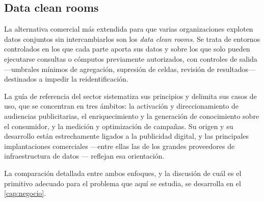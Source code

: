 \subsection{Data clean rooms}

La alternativa comercial más extendida para que varias organizaciones exploten datos conjuntos sin
intercambiarlos son los \emph{data clean rooms}. Se trata de entornos controlados en los que cada
parte aporta sus datos y sobre los que solo pueden ejecutarse consultas o cómputos previamente
autorizados, con controles de salida —umbrales mínimos de agregación, supresión de celdas, revisión
de resultados— destinados a impedir la reidentificación.

La guía de referencia del sector \parencite{iabtechlab2024} sistematiza sus principios y delimita
sus casos de uso, que se concentran en tres ámbitos: la activación y direccionamiento de audiencias
publicitarias, el enriquecimiento y la generación de conocimiento sobre el consumidor, y la
medición y optimización de campañas. Su origen y su desarrollo están estrechamente ligados a la
publicidad digital, y las principales implantaciones comerciales —entre ellas las de los grandes
proveedores de infraestructura de datos \parencite{snowflake_dcr}— reflejan esa orientación.

La comparación detallada entre ambos enfoques, y la discusión de cuál es el primitivo adecuado para
el problema que aquí se estudia, se desarrolla en el \cref{cap:negocio}.
